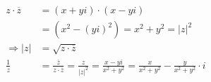 \documentclass[11pt, twoside, a4paper]{article}
\theoremstyle{plain}
\newcommand{\abs}[1]{\left|#1\right|}
\newcommand{\impl}[0]{\Rightarrow{}}
\begin{document}
    \begin{align*}
        z\cdot\overline{z} &= (x+yi) \cdot (x-yi)\\
        &= (x^2-(yi)^2) = x^2+y^2 = \abs{z}^2\\
        \impl \abs{z} &= \sqrt{z\cdot\overline{z}}\\
        \frac{1}{z} &= \frac{\overline{z}}{z\cdot\overline{z}} = \frac{z}{\abs{z}^2} = \frac{x-yi}{x^2+y^2} = \frac{x}{x^2+y^2} - \frac{y}{x^2+y^2}\cdot i
    \end{align*}
\end{document}
